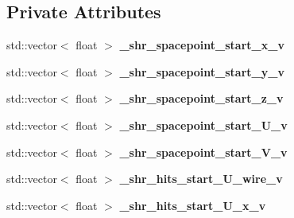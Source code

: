 \subsection*{Private Attributes}
\begin{DoxyCompactItemize}
\item 
\hypertarget{classanalysis_1_1ShowerStartPoint_ab1a5f63745829c06c4ee7a30db99b47b}{std\-::vector$<$ float $>$ {\bfseries \-\_\-shr\-\_\-spacepoint\-\_\-start\-\_\-x\-\_\-v}}\label{classanalysis_1_1ShowerStartPoint_ab1a5f63745829c06c4ee7a30db99b47b}

\item 
\hypertarget{classanalysis_1_1ShowerStartPoint_a9284ff719c659b758bfb91b18ddbd72c}{std\-::vector$<$ float $>$ {\bfseries \-\_\-shr\-\_\-spacepoint\-\_\-start\-\_\-y\-\_\-v}}\label{classanalysis_1_1ShowerStartPoint_a9284ff719c659b758bfb91b18ddbd72c}

\item 
\hypertarget{classanalysis_1_1ShowerStartPoint_a07a6b32d99fc862660a9bcfc735f71e1}{std\-::vector$<$ float $>$ {\bfseries \-\_\-shr\-\_\-spacepoint\-\_\-start\-\_\-z\-\_\-v}}\label{classanalysis_1_1ShowerStartPoint_a07a6b32d99fc862660a9bcfc735f71e1}

\item 
\hypertarget{classanalysis_1_1ShowerStartPoint_ae4900f655cd3af95549d5063c662c8f6}{std\-::vector$<$ float $>$ {\bfseries \-\_\-shr\-\_\-spacepoint\-\_\-start\-\_\-\-U\-\_\-v}}\label{classanalysis_1_1ShowerStartPoint_ae4900f655cd3af95549d5063c662c8f6}

\item 
\hypertarget{classanalysis_1_1ShowerStartPoint_af1f9e524dd586a6a460c1b215f21165a}{std\-::vector$<$ float $>$ {\bfseries \-\_\-shr\-\_\-spacepoint\-\_\-start\-\_\-\-V\-\_\-v}}\label{classanalysis_1_1ShowerStartPoint_af1f9e524dd586a6a460c1b215f21165a}

\item 
\hypertarget{classanalysis_1_1ShowerStartPoint_a2f08520bb3b2b366c56585094d44b30f}{std\-::vector$<$ float $>$ {\bfseries \-\_\-shr\-\_\-hits\-\_\-start\-\_\-\-U\-\_\-wire\-\_\-v}}\label{classanalysis_1_1ShowerStartPoint_a2f08520bb3b2b366c56585094d44b30f}

\item 
\hypertarget{classanalysis_1_1ShowerStartPoint_a1d6cfc632ab221e7a11856b504630df8}{std\-::vector$<$ float $>$ {\bfseries \-\_\-shr\-\_\-hits\-\_\-start\-\_\-\-U\-\_\-x\-\_\-v}}\label{classanalysis_1_1ShowerStartPoint_a1d6cfc632ab221e7a11856b504630df8}


\end{DoxyCompactItemize}
